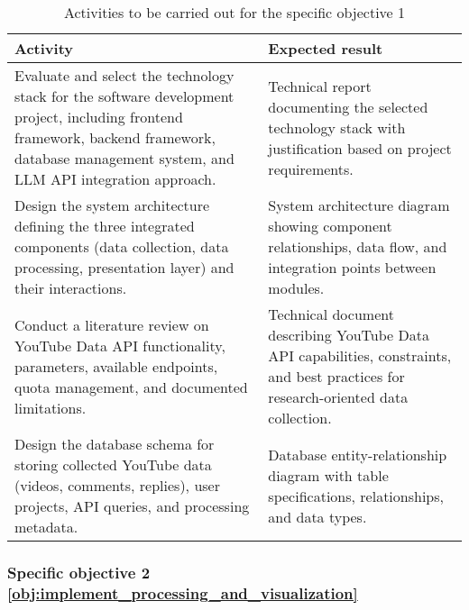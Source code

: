 \begin{table}[htbp]
	\centering
	\small
	\caption{Activities to be carried out for the specific objective 1}
	\label{tab:activities_specific_objective_1}
	\begin{tabularx}{\textwidth}{>{\raggedright\arraybackslash}p{4cm}X}
		\toprule
		\textbf{Activity} & \textbf{Expected result} \\
		\midrule
		Evaluate and select the technology stack for the software development project, including frontend framework, backend framework, database management system, and LLM API integration approach. & Technical report documenting the selected technology stack with justification based on project requirements. \\
		\midrule
		Design the system architecture defining the three integrated components (data collection, data processing, presentation layer) and their interactions. & System architecture diagram showing component relationships, data flow, and integration points between modules. \\
		\midrule
		Conduct a literature review on YouTube Data API functionality, parameters, available endpoints, quota management, and documented limitations. & Technical document describing YouTube Data API capabilities, constraints, and best practices for research-oriented data collection. \\
		\midrule
		Design the database schema for storing collected YouTube data (videos, comments, replies), user projects, API queries, and processing metadata. & Database entity-relationship diagram with table specifications, relationships, and data types. \\
		\bottomrule
	\end{tabularx}
\end{table}

\subsubsection{Specific objective 2 \ref{obj:implement_processing_and_visualization}}

